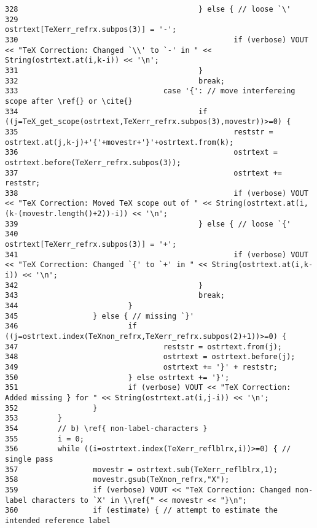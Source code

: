 \begin{verbatim}
328                                         } else { // loose `\'
329                                                 ostrtext[TeXerr_refrx.subpos(3)] = '-';
330                                                 if (verbose) VOUT << "TeX Correction: Changed `\\' to `-' in " << String(ostrtext.at(i,k-i)) << '\n';
331                                         }
332                                         break;
333                                 case '{': // move interfereing scope after \ref{} or \cite{}
334                                         if ((j=TeX_get_scope(ostrtext,TeXerr_refrx.subpos(3),movestr))>=0) {
335                                                 reststr = ostrtext.at(j,k-j)+'{'+movestr+'}'+ostrtext.from(k);
336                                                 ostrtext = ostrtext.before(TeXerr_refrx.subpos(3));
337                                                 ostrtext += reststr;
338                                                 if (verbose) VOUT << "TeX Correction: Moved TeX scope out of " << String(ostrtext.at(i,(k-(movestr.length()+2))-i)) << '\n';
339                                         } else { // loose `{'
340                                                 ostrtext[TeXerr_refrx.subpos(3)] = '+';
341                                                 if (verbose) VOUT << "TeX Correction: Changed `{' to `+' in " << String(ostrtext.at(i,k-i)) << '\n';
342                                         }
343                                         break;
344                         }
345                 } else { // missing `}'
346                         if ((j=ostrtext.index(TeXnon_refrx,TeXerr_refrx.subpos(2)+1))>=0) {
347                                 reststr = ostrtext.from(j);
348                                 ostrtext = ostrtext.before(j);
349                                 ostrtext += '}' + reststr;
350                         } else ostrtext += '}';
351                         if (verbose) VOUT << "TeX Correction: Added missing } for " << String(ostrtext.at(i,j-i)) << '\n';
352                 }
353         }
354         // b) \ref{ non-label-characters }
355         i = 0;
356         while ((i=ostrtext.index(TeXerr_reflblrx,i))>=0) { // single pass
357                 movestr = ostrtext.sub(TeXerr_reflblrx,1);
358                 movestr.gsub(TeXnon_refrx,"X");
359                 if (verbose) VOUT << "TeX Correction: Changed non-label characters to `X' in \\ref{" << movestr << "}\n";
360                 if (estimate) { // attempt to estimate the intended reference label

\end{verbatim}
